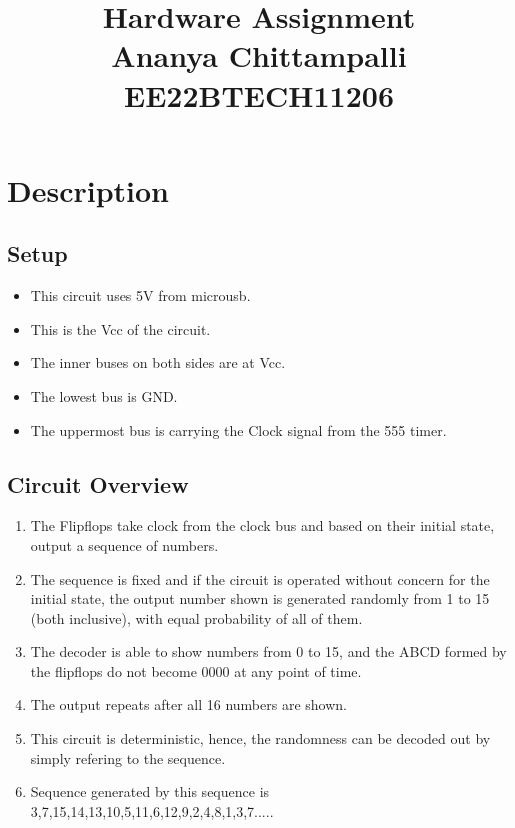 \documentclass{article}
\begin{document}
\title{Hardware Assignment\\ \large{Ananya Chittampalli\\EE22BTECH11206}}
\author{}
\date{}
\maketitle

\maketitle

\section*{Description}

\subsection*{Setup}
\begin{itemize}
    \item This circuit uses 5V from microusb.
    \item This is the Vcc of the circuit. 
    \item The inner buses on both sides are at Vcc. 
    \item The lowest bus is GND. 
    \item The uppermost bus is carrying the Clock signal from the 555 timer.
\end{itemize}

\subsection*{Circuit Overview}
\begin{enumerate}
    \item The Flipflops take clock from the clock bus and based on their initial state, output a sequence of numbers.
    \item The sequence is fixed and if the circuit is operated without concern for the initial state, the output number shown is generated randomly from 1 to 15 (both inclusive), with equal probability of all of them.
    \item The decoder is able to show numbers from 0 to 15, and the ABCD formed by the flipflops do not become 0000 at any point of time.
    \item The output repeats after all 16 numbers are shown.
    \item This circuit is deterministic, hence, the randomness can be decoded out by simply refering to the sequence. 
    \item Sequence generated by this sequence is 3,7,15,14,13,10,5,11,6,12,9,2,4,8,1,3,7.....
\end{enumerate}
\end{document}
